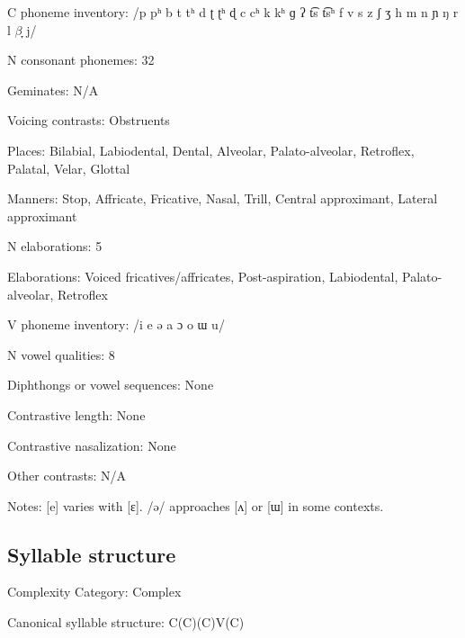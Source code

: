 {\begin{appendixdesc}
\item[C phoneme inventory:] /p pʰ b t tʰ d ʈ ʈʰ ɖ c cʰ k kʰ ɡ ʔ t͡s t͡sʰ f v s z ʃ ʒ h m n ɲ ŋ r l $\beta ̞$ j/

\item[N consonant phonemes:] 32

\item[Geminates:] N/A

\item[Voicing contrasts:] Obstruents

\item[Places:] Bilabial, Labiodental, Dental, Alveolar, Palato-alveolar, Retroflex, Palatal, Velar, Glottal

\item[Manners:] Stop, Affricate, Fricative, Nasal, Trill, Central approximant, Lateral approximant

\item[N elaborations:] 5

\item[Elaborations:] Voiced fricatives/affricates, Post-aspiration, Labiodental, Palato-alveolar, Retroflex

\item[V phoneme inventory:] /i e ə a ɔ o ɯ u/

\item[N vowel qualities:] 8

\item[Diphthongs or vowel sequences:] None

\item[Contrastive length:] None

\item[Contrastive nasalization:] None

\item[Other contrasts:] N/A

\item[Notes:] [e] varies with [ɛ]. /ə/ approaches [ʌ] or [ɯ] in some contexts.
\end{appendixdesc}
\subsection*{Syllable structure}
\begin{appendixdesc}

\item[Complexity Category:] Complex

\item[Canonical syllable structure:] C(C)(C)V(C) \citep[30--32]{Plaisier2007}


\end{appendixdesc}}
